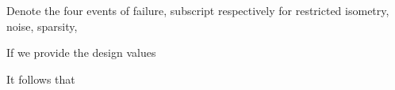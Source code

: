{
\I Denote the four events of failure, subscript respectively for restricted isometry, noise, sparsity,

\I If we provide the design values

\I It follows that
}


